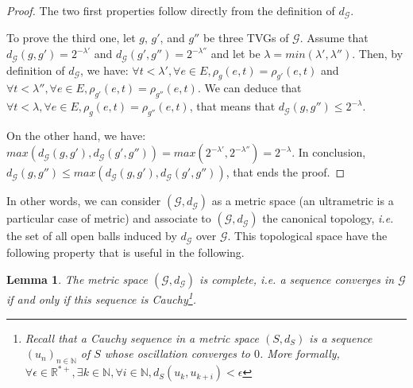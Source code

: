 \documentclass[11pt]{article}
\newtheorem{lemma}{Lemma}
\begin{document}
\begin{proof}
The two first properties follow directly from the definition of $d_\mathcal{G}$. 

To prove the third one, let $g$, $g'$, and $g''$ be three TVGs of $\mathcal{G}$. Assume that $d_\mathcal{G}(g,g')=2^{-\lambda'}$ and $d_\mathcal{G}(g',g'')=2^{-\lambda''}$ and let be $\lambda=min(\lambda',\lambda'')$. Then, by definition of $d_\mathcal{G}$, we have: $\forall t<\lambda',\forall e\in E,\rho_g(e,t)=\rho_{g'}(e,t)$ and $\forall t<\lambda'',\forall e\in E,\rho_{g'}(e,t)=\rho_{g''}(e,t)$. We can deduce that $\forall t<\lambda,\forall e\in E,\rho_g(e,t)=\rho_{g''}(e,t)$, that means that $d_\mathcal{G}(g,g'')\leq 2^{-\lambda}$.

On the other hand, we have: $max(d_\mathcal{G}(g,g'),d_\mathcal{G}(g',g''))=max(2^{-\lambda'},2^{-\lambda''})=2^{-\lambda}$. In conclusion, $d_\mathcal{G}(g,g'')\leq max(d_\mathcal{G}(g,g'),d_\mathcal{G}(g',g''))$, that ends the proof.
\end{proof}

In other words, we can consider $(\mathcal{G}, d_\mathcal{G})$ as a metric space (an ultrametric is a particular case
of metric) and associate to $(\mathcal{G}, d_\mathcal{G})$ the canonical topology, \emph{i.e.} the set of all open
balls induced by $d_\mathcal{G}$ over $\mathcal{G}$. This topological space have the following property that is useful
in the following.

\begin{lemma}\label{lem:gcomplete}
The metric space $(\mathcal{G}, d_\mathcal{G})$ is complete, \emph{i.e.} a sequence converges in $\mathcal{G}$ if and only if this sequence is Cauchy\footnote{Recall that a Cauchy sequence in a metric space $(S,d_S)$ is a sequence $(u_n)_{n\in\mathbb{N}}$ of $S$ whose oscillation converges to $0$. More formally, $\forall \epsilon\in\mathbb{R}^{*+},\exists k\in\mathbb{N}, \forall i\in\mathbb{N}, d_S(u_{k},u_{k+i})<\epsilon$}.
\end{lemma} 
\end{document}
